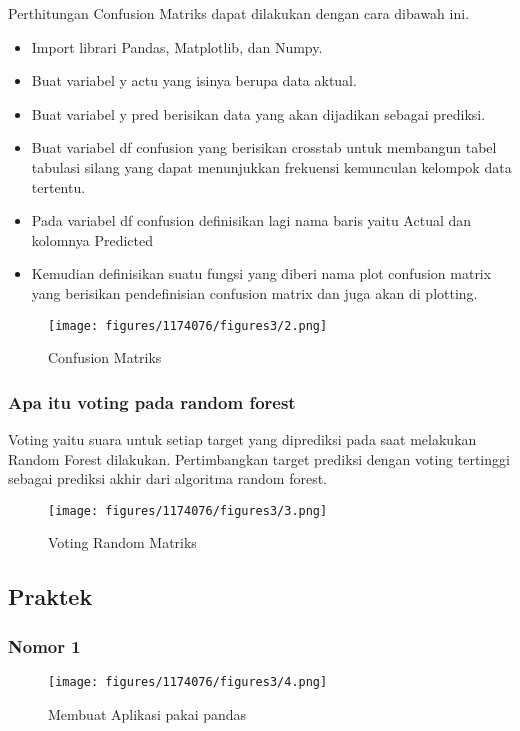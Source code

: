 \hfill\break
Perthitungan Confusion Matriks dapat dilakukan dengan cara dibawah ini.
\begin{itemize}
\item
Import librari Pandas, Matplotlib, dan Numpy.
\item
Buat variabel y actu yang isinya berupa data aktual.
\item
Buat variabel y pred berisikan data yang akan dijadikan sebagai prediksi.
\item
Buat variabel df confusion yang berisikan crosstab untuk membangun tabel tabulasi silang yang dapat menunjukkan frekuensi kemunculan kelompok data tertentu.
\item
Pada variabel df confusion definisikan lagi nama baris yaitu Actual dan kolomnya Predicted
\item
Kemudian definisikan suatu fungsi yang diberi nama plot confusion matrix yang berisikan pendefinisian confusion matrix dan juga akan di plotting.

\end{itemize}
\begin{figure}[H]
\centerline{\texttt{[image: figures/1174076/figures3/2.png]}}
\caption{Confusion Matriks}
\label{labelgambar}
\end{figure}

\subsubsection{Apa itu voting pada random forest}

\hfill\break
Voting yaitu suara untuk setiap target yang diprediksi pada saat melakukan Random Forest dilakukan. Pertimbangkan target prediksi dengan voting tertinggi sebagai prediksi akhir dari algoritma random forest.

\begin{figure}[H]
\centerline{\texttt{[image: figures/1174076/figures3/3.png]}}
\caption{Voting Random Matriks}
\label{labelgambar}
\end{figure}


\subsection{Praktek}
\subsubsection{Nomor 1}
\hfill\break

\begin{figure}[H]
\centerline{\texttt{[image: figures/1174076/figures3/4.png]}}
\caption{Membuat Aplikasi pakai pandas}
\label{labelgambar}
\end{figure}

